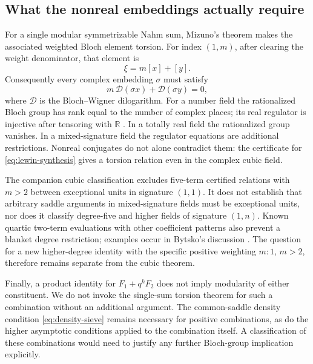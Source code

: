 \documentclass[11pt,reqno]{amsart}
\theoremstyle{remark}
\numberwithin{equation}{section}
\newcommand{\RR}{\mathbb R}
\begin{document}
\subsection{What the nonreal embeddings actually require}
For a single modular symmetrizable Nahm sum, Mizuno's theorem
\cite[Theorem~3.3]{Mizuno} makes the associated weighted Bloch element
torsion. For index $(1,m)$, after clearing the weight denominator, that
element is
\[
 \xi=m[x]+[y].
\]
Consequently every complex embedding $\sigma$ must satisfy
\begin{equation}\label{eq:regulator-test}
 m\,\mathscr D(\sigma x)+\mathscr D(\sigma y)=0,
\end{equation}
where $\mathscr D$ is the Bloch--Wigner dilogarithm. For a number field
the rationalized Bloch group has rank equal to the number of complex
places; its real regulator is injective after tensoring with $\RR$
\cite{ZagierDilog}. In a totally real field the rationalized group
vanishes. In a mixed-signature field the regulator equations are
additional restrictions. Nonreal conjugates do not alone contradict them:
the certificate for \eqref{eq:lewin-synthesis} gives a torsion relation
even in the complex cubic field.

The companion cubic classification \cite{CubicClassification} excludes
five-term certified relations with $m>2$ between exceptional units in
signature $(1,1)$. It does not establish that arbitrary saddle arguments
in mixed-signature fields must be exceptional units, nor does it classify
degree-five and higher fields of signature $(1,n)$. Known quartic
two-term evaluations with other coefficient patterns also prevent a
blanket degree restriction; examples occur in Bytsko's discussion
\cite[Section~3]{Bytsko}. The question for a new higher-degree identity
with the specific positive weighting $m:1$, $m>2$, therefore remains
separate from the cubic theorem.

Finally, a product identity for $F_1+q^kF_2$ does not imply modularity of
either constituent. We do not invoke the single-sum torsion theorem for
such a combination without an additional argument. The common-saddle
density condition \eqref{eq:density-sieve} remains necessary for positive
combinations, as do the higher asymptotic conditions applied to the
combination itself. A classification of these combinations would need
to justify any further Bloch-group implication explicitly.
\appendix
\end{document}
